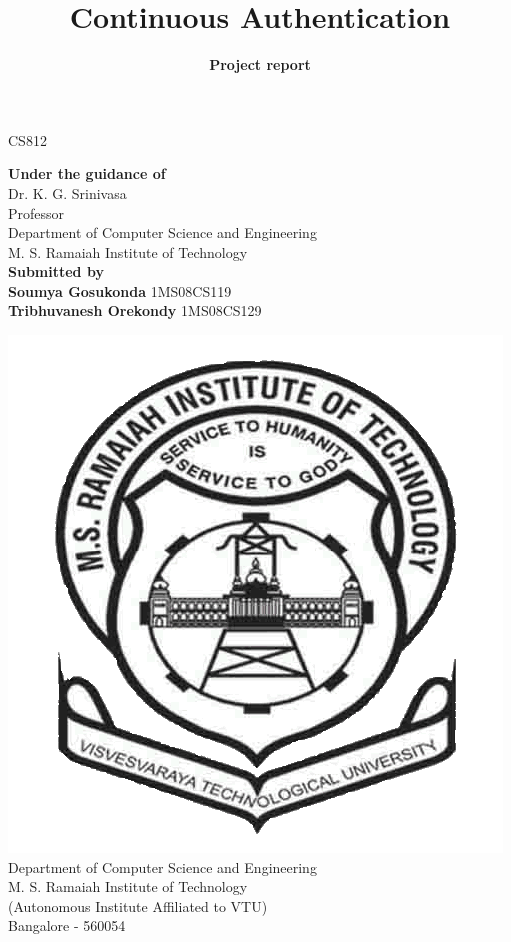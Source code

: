 \documentclass[12pt]{article}			%
\title{Continuous Authentication}	%
\author{{\bf Project report}{\bf}}
\date{}				%
\begin{document}

\maketitle				%
\thispagestyle{empty}			%

\begin{center}

{\Large CS812}\\[3ex]
{\Large}

{\large}
{\bf Under the guidance of }{\bf}\\[2ex]
Dr. K. G. Srinivasa\\
Professor\\
Department of Computer Science and Engineering\\
M. S. Ramaiah Institute of Technology\\[3ex]


{\bf Submitted by}{\bf}\\[2ex]
{\bf Soumya Gosukonda }{\bf} 1MS08CS119\\
{\bf Tribhuvanesh Orekondy }{\bf} 1MS08CS129\\[8ex]
{\large}

\includegraphics[scale=0.20]{msrit.png}\\
Department of Computer Science and Engineering\\
M. S. Ramaiah Institute of Technology\\
(Autonomous Institute Affiliated to VTU)\\
Bangalore - 560054
\end{center}
\end{document}
